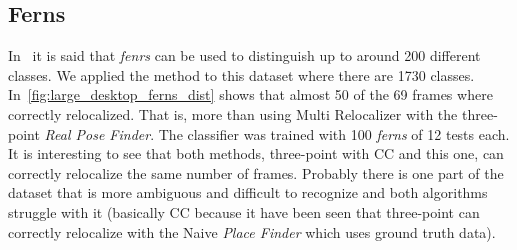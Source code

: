 \subsection{Ferns}
\label{sub:large_ferns}

In~\cite{Ozuysal2010} it is said that \textit{fenrs} can be used to distinguish up to around 200 different classes. We applied the method to this dataset where there are 1730 classes. In~\ref{fig:large_desktop_ferns_dist} shows that almost 50 of the 69 frames where correctly relocalized. That is, more than using Multi Relocalizer with the three-point \textit{Real Pose Finder}. The classifier was trained with 100 \textit{ferns} of 12 tests each.\\

It is interesting to see that both methods, three-point with CC and this one, can correctly relocalize the same number of frames. Probably there is one part of the dataset that is more ambiguous and difficult to recognize and both algorithms struggle with it (basically CC because it have been seen that three-point can correctly relocalize with the Naive \textit{Place Finder} which uses ground truth data).

